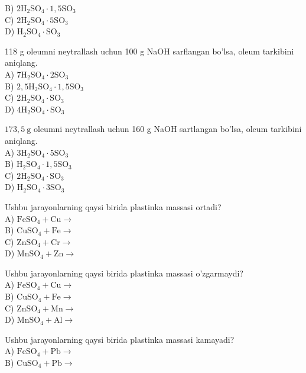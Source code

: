 B) $2 \mathrm{H}_{2} \mathrm{SO}_{4} \cdot 1,5 \mathrm{SO}_{3}$\\
C) $2 \mathrm{H}_{2} \mathrm{SO}_{4} \cdot 5 \mathrm{SO}_{3}$\\
D) $\mathrm{H}_{2} \mathrm{SO}_{4} \cdot \mathrm{SO}_{3}$
  \item 118 g oleumni neytrallash uchun 100 g NaOH sarflangan bo'lsa, oleum tarkibini aniqlang.\\
A) $7 \mathrm{H}_{2} \mathrm{SO}_{4} \cdot 2 \mathrm{SO}_{3}$\\
B) $2,5 \mathrm{H}_{2} \mathrm{SO}_{4} \cdot 1,5 \mathrm{SO}_{3}$\\
C) $2 \mathrm{H}_{2} \mathrm{SO}_{4} \cdot \mathrm{SO}_{3}$\\
D) $4 \mathrm{H}_{2} \mathrm{SO}_{4} \cdot \mathrm{SO}_{3}$
  \item $173,5 \mathrm{~g}$ oleumni neytrallash uchun 160 g NaOH sartlangan bo'lsa, oleum tarkibini aniqlang.\\
A) $3 \mathrm{H}_{2} \mathrm{SO}_{4} \cdot 5 \mathrm{SO}_{3}$\\
B) $\mathrm{H}_{2} \mathrm{SO}_{4} \cdot 1,5 \mathrm{SO}_{3}$\\
C) $2 \mathrm{H}_{2} \mathrm{SO}_{4} \cdot \mathrm{SO}_{3}$\\
D) $\mathrm{H}_{2} \mathrm{SO}_{4} \cdot 3 \mathrm{SO}_{3}$
  \item Ushbu jarayonlarning qaysi birida plastinka massasi ortadi?\\
A) $\mathrm{FeSO}_{4}+\mathrm{Cu} \rightarrow$\\
B) $\mathrm{CuSO}_{4}+\mathrm{Fe} \rightarrow$\\
C) $\mathrm{ZnSO}_{4}+\mathrm{Cr} \rightarrow$\\
D) $\mathrm{MnSO}_{4}+\mathrm{Zn} \rightarrow$\\
  \item Ushbu jarayonlarning qaysi birida plastinka massasi o'zgarmaydi?\\
A) $\mathrm{FeSO}_{4}+\mathrm{Cu} \rightarrow$\\
B) $\mathrm{CuSO}_{4}+\mathrm{Fe} \rightarrow$\\
C) $\mathrm{ZnSO}_{4}+\mathrm{Mn} \rightarrow$\\
D) $\mathrm{MnSO}_{4}+\mathrm{Al} \rightarrow$
  \item Ushbu jarayonlarning qaysi birida plastinka massasi kamayadi?\\
A) $\mathrm{FeSO}_{4}+\mathrm{Pb} \rightarrow$\\
B) $\mathrm{CuSO}_{4}+\mathrm{Pb} \rightarrow$\\
